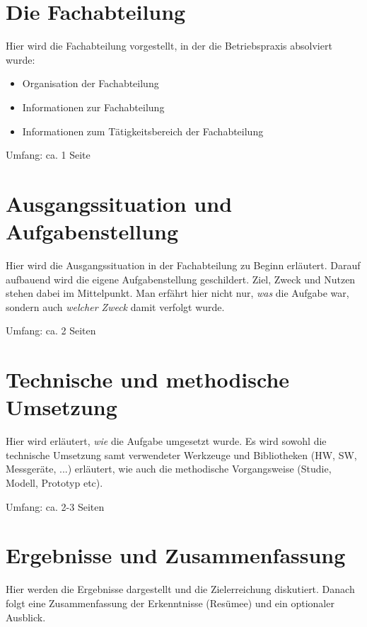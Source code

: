 \documentclass[praktikum,german]{hgbthesis}
\begin{document}
\chapter{Die Fachabteilung}
\color{blue}
Hier wird die Fachabteilung vorgestellt, in der die Betriebspraxis absolviert wurde:
\begin{itemize}
\item Organisation der Fachabteilung
\item Informationen zur Fachabteilung
\item Informationen zum Tätigkeitsbereich der Fachabteilung
\end{itemize}

\vskip 8mm
Umfang: ca. 1 Seite
\color{black}


\chapter{Ausgangssituation und Aufgabenstellung}
\color{blue}
Hier wird die Ausgangssituation in der Fachabteilung zu Beginn erläutert. Darauf aufbauend wird die eigene Aufgabenstellung geschildert. Ziel, Zweck und Nutzen stehen dabei im Mittelpunkt. Man erfährt hier nicht nur, \emph{was} die Aufgabe war, sondern auch \emph{welcher Zweck} damit verfolgt wurde.

\vskip 8mm
Umfang: ca. 2 Seiten
\color{black}


\chapter{Technische und methodische Umsetzung}
\color{blue}
Hier wird erläutert, \emph{wie} die Aufgabe umgesetzt wurde. Es wird sowohl die technische Umsetzung samt verwendeter Werkzeuge und Bibliotheken (HW, SW, Messgeräte, ...) erläutert, wie auch die methodische Vorgangsweise (Studie, Modell, Prototyp etc).

\vskip 8mm
Umfang: ca. 2-3 Seiten 
\color{black}

   
\chapter{Ergebnisse und Zusammenfassung}
\color{blue}
Hier werden die Ergebnisse dargestellt und die Zielerreichung diskutiert. Danach folgt eine Zusammenfassung der Erkenntnisse (Resümee) und ein optionaler Ausblick.
\end{document}
